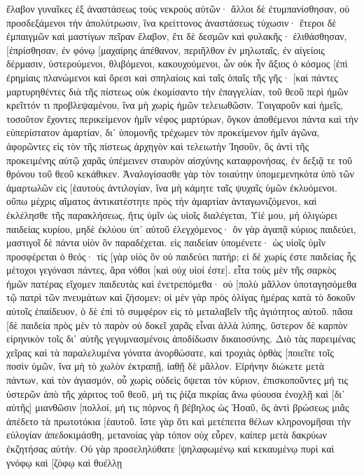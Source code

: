 ἔλαβον γυναῖκες ἐξ ἀναστάσεως τοὺς νεκροὺς αὐτῶν· ἄλλοι δὲ ἐτυμπανίσθησαν, οὐ προσδεξάμενοι τὴν ἀπολύτρωσιν, ἵνα κρείττονος ἀναστάσεως τύχωσιν· 
ἕτεροι δὲ ἐμπαιγμῶν καὶ μαστίγων πεῖραν ἔλαβον, ἔτι δὲ δεσμῶν καὶ φυλακῆς· 
ἐλιθάσθησαν, [ἐπρίσθησαν, ἐν φόνῳ [μαχαίρης ἀπέθανον, περιῆλθον ἐν μηλωταῖς, ἐν αἰγείοις δέρμασιν, ὑστερούμενοι, θλιβόμενοι, κακουχούμενοι, 
ὧν οὐκ ἦν ἄξιος ὁ κόσμος [ἐπὶ ἐρημίαις πλανώμενοι καὶ ὄρεσι καὶ σπηλαίοις καὶ ταῖς ὀπαῖς τῆς γῆς· 
[καὶ πάντες μαρτυρηθέντες διὰ τῆς πίστεως οὐκ ἐκομίσαντο τὴν ἐπαγγελίαν, 
τοῦ θεοῦ περὶ ἡμῶν κρεῖττόν τι προβλεψαμένου, ἵνα μὴ χωρὶς ἡμῶν τελειωθῶσιν. 
Τοιγαροῦν καὶ ἡμεῖς, τοσοῦτον ἔχοντες περικείμενον ἡμῖν νέφος μαρτύρων, ὄγκον ἀποθέμενοι πάντα καὶ τὴν εὐπερίστατον ἁμαρτίαν, δι᾽ ὑπομονῆς τρέχωμεν τὸν προκείμενον ἡμῖν ἀγῶνα, 
ἀφορῶντες εἰς τὸν τῆς πίστεως ἀρχηγὸν καὶ τελειωτὴν Ἰησοῦν, ὃς ἀντὶ τῆς προκειμένης αὐτῷ χαρᾶς ὑπέμεινεν σταυρὸν αἰσχύνης καταφρονήσας, ἐν δεξιᾷ τε τοῦ θρόνου τοῦ θεοῦ κεκάθικεν. 
Ἀναλογίσασθε γὰρ τὸν τοιαύτην ὑπομεμενηκότα ὑπὸ τῶν ἁμαρτωλῶν εἰς [ἑαυτοὺς ἀντιλογίαν, ἵνα μὴ κάμητε ταῖς ψυχαῖς ὑμῶν ἐκλυόμενοι. 
οὔπω μέχρις αἵματος ἀντικατέστητε πρὸς τὴν ἁμαρτίαν ἀνταγωνιζόμενοι, 
καὶ ἐκλέλησθε τῆς παρακλήσεως, ἥτις ὑμῖν ὡς υἱοῖς διαλέγεται, Υἱέ μου, μὴ ὀλιγώρει παιδείας κυρίου, μηδὲ ἐκλύου ὑπ᾽ αὐτοῦ ἐλεγχόμενος· 
ὃν γὰρ ἀγαπᾷ κύριος παιδεύει, μαστιγοῖ δὲ πάντα υἱὸν ὃν παραδέχεται. 
εἰς παιδείαν ὑπομένετε· ὡς υἱοῖς ὑμῖν προσφέρεται ὁ θεός· τίς [γὰρ υἱὸς ὃν οὐ παιδεύει πατήρ; 
εἰ δὲ χωρίς ἐστε παιδείας ἧς μέτοχοι γεγόνασι πάντες, ἄρα νόθοι [καὶ οὐχ υἱοί ἐστε]. 
εἶτα τοὺς μὲν τῆς σαρκὸς ἡμῶν πατέρας εἴχομεν παιδευτὰς καὶ ἐνετρεπόμεθα· οὐ [πολὺ μᾶλλον ὑποταγησόμεθα τῷ πατρὶ τῶν πνευμάτων καὶ ζήσομεν; 
οἱ μὲν γὰρ πρὸς ὀλίγας ἡμέρας κατὰ τὸ δοκοῦν αὐτοῖς ἐπαίδευον, ὁ δὲ ἐπὶ τὸ συμφέρον εἰς τὸ μεταλαβεῖν τῆς ἁγιότητος αὐτοῦ. 
πᾶσα [δὲ παιδεία πρὸς μὲν τὸ παρὸν οὐ δοκεῖ χαρᾶς εἶναι ἀλλὰ λύπης, ὕστερον δὲ καρπὸν εἰρηνικὸν τοῖς δι᾽ αὐτῆς γεγυμνασμένοις ἀποδίδωσιν δικαιοσύνης. 
Διὸ τὰς παρειμένας χεῖρας καὶ τὰ παραλελυμένα γόνατα ἀνορθώσατε, 
καὶ τροχιὰς ὀρθὰς [ποιεῖτε τοῖς ποσὶν ὑμῶν, ἵνα μὴ τὸ χωλὸν ἐκτραπῇ, ἰαθῇ δὲ μᾶλλον. 
Εἰρήνην διώκετε μετὰ πάντων, καὶ τὸν ἁγιασμόν, οὗ χωρὶς οὐδεὶς ὄψεται τὸν κύριον, 
ἐπισκοποῦντες μή τις ὑστερῶν ἀπὸ τῆς χάριτος τοῦ θεοῦ, μή τις ῥίζα πικρίας ἄνω φύουσα ἐνοχλῇ καὶ [δι᾽ αὐτῆς] μιανθῶσιν [πολλοί, 
μή τις πόρνος ἢ βέβηλος ὡς Ἠσαῦ, ὃς ἀντὶ βρώσεως μιᾶς ἀπέδετο τὰ πρωτοτόκια [ἑαυτοῦ. 
ἴστε γὰρ ὅτι καὶ μετέπειτα θέλων κληρονομῆσαι τὴν εὐλογίαν ἀπεδοκιμάσθη, μετανοίας γὰρ τόπον οὐχ εὗρεν, καίπερ μετὰ δακρύων ἐκζητήσας αὐτήν. 
Οὐ γὰρ προσεληλύθατε [ψηλαφωμένῳ καὶ κεκαυμένῳ πυρὶ καὶ γνόφῳ καὶ [ζόφῳ καὶ θυέλλῃ 
